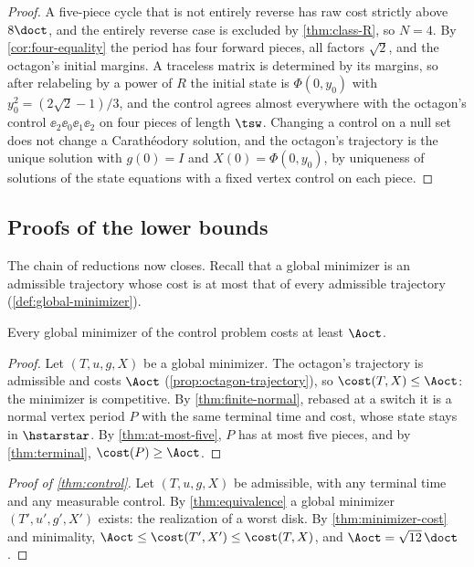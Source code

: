 \begin{proof}
A five-piece cycle that is not entirely reverse has raw cost strictly above $8\doct$, and the
entirely reverse case is excluded by \cref{thm:class-R}, so $N=4$. By \cref{cor:four-equality} the period has four forward pieces,
all factors $\sqrt2$, and the octagon's initial margins. A traceless matrix is determined by its
margins, so after relabeling by a power of $R$ the initial state is $\Phi(0,y_0)$ with
$y_0^2=(2\sqrt2-1)/3$, and the control agrees almost everywhere with the octagon's control
$\ee_2\ee_0\ee_1\ee_2$ on four pieces of length $\tsw$. Changing a control on a null set does not
change a Carath\'eodory solution, and the octagon's trajectory is the unique solution with
$g(0)=I$ and $X(0)=\Phi(0,y_0)$, by uniqueness of solutions of the state equations with a fixed
vertex control on each piece.
\end{proof}

\subsection{Proofs of the lower bounds}\label{sec:terminal-proofs}

The chain of reductions now closes. Recall that a global minimizer is an admissible trajectory
whose cost is at most that of every admissible trajectory (\cref{def:global-minimizer}).

\begin{theorem}\label{thm:minimizer-cost}
Every global minimizer of the control problem costs at least $\Aoct$.
\end{theorem}

\begin{proof}
Let $(T,u,g,X)$ be a global minimizer. The octagon's trajectory is admissible and costs $\Aoct$
(\cref{prop:octagon-trajectory}), so $\cost(T,X)\le\Aoct$: the minimizer is competitive. By
\cref{thm:finite-normal}, rebased at a
switch it is a normal vertex period $P$ with the same terminal time and cost, whose state stays
in $\hstarstar$. By \cref{thm:at-most-five}, $P$ has at most five pieces, and by
\cref{thm:terminal}, $\cost(P)\ge\Aoct$.
\end{proof}

\begin{proof}[Proof of \cref{thm:control}]
Let $(T,u,g,X)$ be admissible, with any terminal time and any measurable control. By
\cref{thm:equivalence} a global minimizer $(T',u',g',X')$ exists: the realization of a worst disk.
By \cref{thm:minimizer-cost} and minimality, $\Aoct\le\cost(T',X')\le\cost(T,X)$, and
$\Aoct=\sqrt{12}\,\doct$.
\end{proof}

